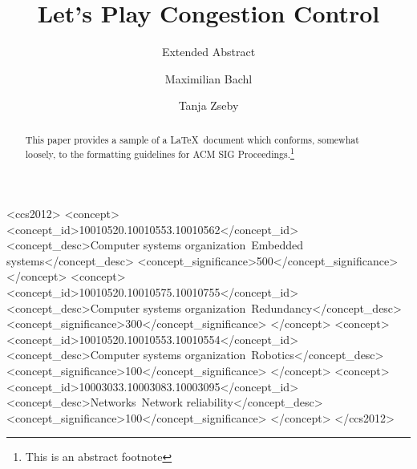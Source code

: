 \documentclass[sigconf]{acmart}
\begin{document}
\title{Let's Play Congestion Control}
\subtitle{Extended Abstract}

\author{Maximilian Bachl} 


\author{Tanja Zseby} 

\renewcommand{\shortauthors}{Bachl, Zseby}


\begin{abstract}
This paper provides a sample of a \LaTeX\ document which conforms,
somewhat loosely, to the formatting guidelines for
ACM SIG Proceedings.\footnote{This is an abstract footnote}
\end{abstract}

%
%
\begin{CCSXML}
<ccs2012>
 <concept>
  <concept_id>10010520.10010553.10010562</concept_id>
  <concept_desc>Computer systems organization~Embedded systems</concept_desc>
  <concept_significance>500</concept_significance>
 </concept>
 <concept>
  <concept_id>10010520.10010575.10010755</concept_id>
  <concept_desc>Computer systems organization~Redundancy</concept_desc>
  <concept_significance>300</concept_significance>
 </concept>
 <concept>
  <concept_id>10010520.10010553.10010554</concept_id>
  <concept_desc>Computer systems organization~Robotics</concept_desc>
  <concept_significance>100</concept_significance>
 </concept>
 <concept>
  <concept_id>10003033.10003083.10003095</concept_id>
  <concept_desc>Networks~Network reliability</concept_desc>
  <concept_significance>100</concept_significance>
 </concept>
</ccs2012>  
\end{CCSXML}
\end{document}
